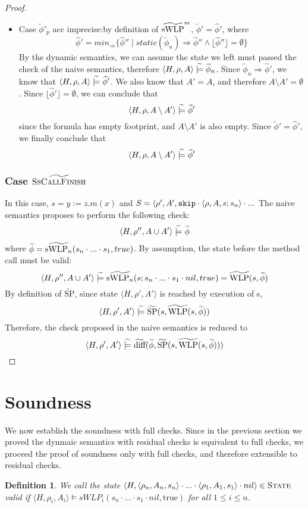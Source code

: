 \documentclass {article}
\newtheorem{definition}[theorem]{Definition}
\newcommand{\true}{\text{true}}
\newcommand{\fphi}{\widehat{\phi}}
\newcommand{\tphi}{\widetilde{\phi}}
\newcommand{\imp}{\Rightarrow}
\newcommand{\consistent}{\models}
\newcommand{\tconsistent}{\hspace{1mm}\widetilde{\models}\hspace{1mm}}
\newcommand{\twlp}[2]{\widetilde{\textup{WLP}}(#1,#2)}
\newcommand{\tswlpn}[2]{\widetilde{\textup{sWLP}_n}(#1,#2)}
\newcommand{\tsp}[2]{\widetilde{\textup{SP}}(#1,#2)}
\newcommand{\tdiff}[2]{\widetilde{\textup{diff}}(#1,#2)}
\begin{document}
\begin{proof}
\begin{enumerate}
\begin{itemize}
    \item Case $\tphi'_p$ acc imprecise:by definition of $\widetilde{\textup{sWLP}}^m$, $\tphi' = \fphi'$, where $$\fphi' = min_{\imp}\{\fphi'' \mid static(\tphi_n) \imp \fphi'' \wedge \lfloor \fphi'' \rfloor = \emptyset\}$$ By the dynamic semantics, we can assume the state we left must passed the check of the naive semantics, therefore $\langle H, \rho, A \rangle \tconsistent \tphi_n$. Since $\tphi_n \imp \fphi'$, we know that $\langle H, \rho, A \rangle \tconsistent \fphi'$. We also know that $A' = A$, and therefore $A \setminus A' = \emptyset$. Since $\lfloor \fphi' \rfloor = \emptyset$, we can conclude that $$\langle H, \rho, A \setminus A'\rangle \tconsistent \fphi'$$ since the formula has empty footprint, and $A \setminus A'$ is also empty. Since $\tphi' = \fphi'$, we finally conclude that $$\langle H, \rho, A \setminus A'\rangle \tconsistent \tphi'$$

\end{itemize}
\end{enumerate}


\subsubsection*{Case $\widetilde{\textsc{SsCallFinish}}$}
In this case, $s = y:=z.m(x)$ and $S =\langle \rho', A', \textup{\texttt{skip}} \cdot \langle \rho, A, s; s_n\rangle \cdot ...$ The naive semantics proposes to perform the following check: 
$$\langle H, \rho'', A \cup A' \rangle \tconsistent \tphi$$ where $\tphi =\tswlpn{s_n \cdot ... \cdot s_1}{true}$. 
By assumption, the state before the method call must be valid: $$\langle H, \rho'', A \cup A' \rangle \tconsistent \tswlpn{s;s_n \cdot ... \cdot s_1 \cdot nil}{ true} = \twlp{s}{\tphi}$$ By definition of $\widetilde{\text{SP}}$, since state $\langle H, \rho', A' \rangle$ is reached by execution of s, $$\langle H, \rho', A' \rangle  \tconsistent \tsp{s}{\twlp{s}{\tphi}}$$ Therefore, the check proposed in the naive semantics is reduced to  $$\langle H, \rho', A' \rangle  \tconsistent \tdiff{\tphi}{\tsp{s}{\twlp{s}{\tphi}}}$$


\end{proof}

\section{Soundness}
\label{section_soundness}
We now establish the soundness with full checks. Since in the previous section we proved the dynmaic semantics with residual checks is equivalent to full checks, we proceed the proof of soundness only with full checks, and therefore extensible to residual checks.
\vspace*{5mm}
\begin{definition}
We call the state $\langle H, \langle \rho_n, A_n, s_n \rangle \cdot ... \cdot \langle \rho_1, A_1, s_1 \rangle \cdot nil \rangle \in \textsc{State}$ valid if $\langle H, \rho_i, A_i \rangle \consistent sWLP_i(s_n\cdot ... \cdot s_1 \cdot nil, \true)$ for all $1 \leq i \leq n$.
\end{definition}
\vspace*{5mm}
\end{document}
